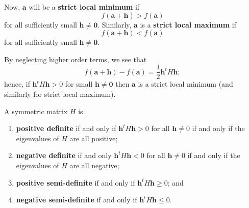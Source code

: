 Now, $\bm a$ will be a \textbf{strict local minimum} if
\[ f(\bm a + \bm h) > f(\bm a) \]
for all sufficiently small $\bm h \neq \bm 0$.
Similarly, $\bm a$ is a \textbf{strict local maximum} if
\[ f(\bm a + \bm h) < f(\bm a) \]
for all sufficiently small $\bm h \neq \bm 0$.

By neglecting higher order terms, we see that
\[ f(\bm a + \bm h) - f(\bm a) = \frac12 \bm h^t H \bm h; \]
hence, if $\bm h^t H \bm h > 0$ for small $\bm h \neq \bm 0$ then $\bm a$ is a strict local minimum (and similarly for strict local maximum).

A symmetric matrix $H$ is 
\begin{enumerate}
    \item \textbf{positive definite} if and only if $\bm h^t H \bm h > 0$ for all $\bm h \neq 0$ if and only if the eigenvalues of $H$ are all positive;
    \item \textbf{negative definite} if and only $\bm h^t H \bm h < 0$ for all $\bm h \neq 0$ if and only if the eigenvalues of $H$ are all negative;
    \item \textbf{positive semi-definite} if and only if $\bm h^t H \bm h \geq 0$; and
    \item \textbf{negative semi-definite} if and only if $\bm h^t H \bm h \leq 0$.
\end{enumerate}

